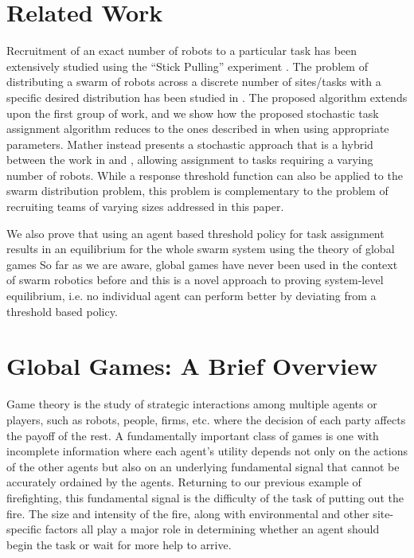 \documentclass[conference]{ieeeconf}
\begin{document}
\section{Related Work}\label{subsec:rw}
Recruitment of an exact number of robots to a particular task has been extensively studied using the ``Stick Pulling'' experiment \cite{Lerman2001,Martinoli2004}. The problem of distributing a swarm of robots across a discrete number of sites/tasks with a specific desired distribution has been studied in \cite{Berman2009,Correll2008}. The proposed algorithm extends upon the first group of work, and we show how the proposed stochastic task assignment algorithm reduces to the ones described in \cite{Lerman2001,Martinoli2004} when using appropriate parameters.  Mather \cite{Mather2010} instead presents a stochastic approach that is a hybrid between the work in \cite{Berman2009} and \cite{Martinoli2004}, allowing assignment to tasks requiring a varying number of robots.
While a response threshold function can also be applied to the swarm distribution problem, this problem is complementary to the problem of recruiting teams of varying sizes addressed in this paper. 

We also prove that using an agent based threshold policy for task assignment results in an equilibrium for the whole swarm system using the theory of global games So far as we are aware, global games have never been used in the context of swarm robotics before and this is a novel approach to proving system-level equilibrium, i.e. no individual agent can perform better by deviating from a threshold based policy.

\section{Global Games: A Brief Overview}\label{sec:ggoverview}
Game theory is the study of strategic interactions among multiple agents or players, such as robots, people, firms, etc. where the decision of each party affects the payoff of the rest. A fundamentally important class of games is one with incomplete information where each agent's utility depends not only on the actions of the other agents but also on an underlying fundamental signal that cannot be accurately ordained by the agents. Returning to our previous example of firefighting, this fundamental signal is the difficulty of the task of putting out the fire. The size and intensity of the fire, along with environmental and other site-specific factors all play a major role in determining whether an agent should begin the task or wait for more help to arrive. 
\end{document}
